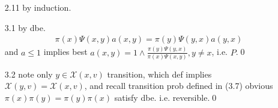 \documentclass[paper=a4, fontsize=11pt]{scrartcl} %
\numberwithin{equation}{section} %
\numberwithin{figure}{section} %
\numberwithin{table}{section} %
\begin{document}
\begin{itemize}
	\item[2.11] by induction.
	\item[3.1] by dbe.
	\begin{align}
		\pi(x)\Psi(x,y)a(x,y) = \pi(y)\Psi(y,x)a(y,x)
	\end{align}
	and $a\leq 1$ implies best $a(x,y)=1\wedge \frac{\pi(y)\Psi(y,x)}{\pi(x)\Psi(x,y)} ,y\neq x$, i.e. $P$.\qed
	\item[3.2] note only $y\in \mathcal{X}(x,v)$ transition, which def implies $\mathcal{X}(y,v)=\mathcal{X}(x,v)$, and recall transition prob defined in (3.7) obvious $\pi(x)\pi(y)=\pi(y)\pi(x)$ satisfy dbe. i.e. reversible.\qed
\end{itemize}
\end{document}
